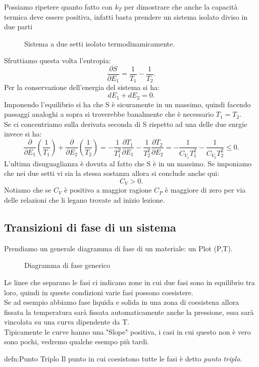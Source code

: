 \noindent 
Possiamo ripetere quanto fatto con $k_{T}$ per dimostrare che anche la capacità termica deve essere positiva, infatti basta prendere un sistema isolato diviso in due parti
\begin{figure}[H]
    \centering
    \caption{Sistema a due setti isolato termodinamicamente.}
    \label{fig:sistema-isolato}
\end{figure}
\noindent
Sfruttiamo questa volta l'entropia:
\[
	\frac{\partial S}{\partial E_1} = \frac{1}{T_1}- \frac{1}{T_2}
.\] 
Per la conservazione dell'energia del sistema si ha:
\[
	dE_1 + dE_2=0
.\] 
Imponendo l'equilibrio si ha che S è sicuramente in un massimo, quindi facendo passaggi analoghi a sopra si troverebbe banalmente che è necessario $T_1 = T_2$.\\
Se ci concentriamo sulla derivata seconda di S rispetto ad una delle due enrgie invece si ha:
\[
	\frac{\partial }{\partial E_1} \left( \frac{1}{T_1} \right) + \frac{\partial }{\partial E_2} \left( \frac{1}{T_2} \right) =
	-\frac{1}{T_1^2}\frac{\partial T_1}{\partial E_1} -\frac{1}{T_2^2}\frac{\partial T_2}{\partial E_2} = 
	-\frac{1}{C_{V_1}T_1^2}-\frac{1}{C_{V_2}T_2^2} \le 0
.\] 
L'ultima disuguaglianza è dovuta al fatto che S è in un massimo. Se imponiamo che nei due setti vi sia la stessa sostanza allora si conclude anche qui:
\[
	C_{V}>0
.\] 
Notiamo che se $C_{V}$ è positivo a maggior ragione $C_{P}$ è maggiore di zero per via delle relazioni che li legano trovate ad inizio lezione.

\subsection{Transizioni di fase di un sistema}%
\label{sec:transizioni-di-fase}
Prendiamo un generale diagramma di fase di un materiale: un Plot (P,T).
\begin{figure}[H]
    \centering
    \caption{Diagramma di fase generico}
    \label{fig:diagramma-di-fase-generico}
\end{figure}
\noindent
Le linee che separano le fasi ci indicano zone in cui due fasi sono in equilibrio tra loro, quindi in queste condizioni varie fasi possono coesistere. \\
Se ad esempio abbiamo fase liquida e solida in una zona di coesistena allora fissata la temperatura sarà fissata automaticamente anche la pressione, essa sarà vincolata su una curva dipendente da T.\\
Tipicamente le curve hanno una "Slope" positiva, i casi in cui questo non è vero sono pochi, vedremo qualche esempo più tardi.\\
\begin{defn}{defn:Punto Triplo}
Il punto in cui coesistono tutte le fasi è detto \textit{punto triplo}.
\end{defn}

